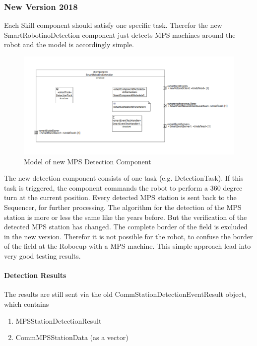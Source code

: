 \subsubsection{ New Version 2018}

Each Skill component should satisfy one specific task. Therefor the new SmartRobotinoDetection component just detects MPS machines around the robot and the model is accordingly simple.

\begin{figure}[h]
\centering
\includegraphics[scale=0.4]{pic/detectionComponent.png}
\caption{Model of new MPS Detection Component}
\label{fig:dockingNew_overview}
\end{figure}

The new detection component consists of one task (e.g. DetectionTask). If this task is triggered, the component commands the robot to perform a 360 degree turn at the current position. Every detected MPS station is sent back to the Sequencer, for further processing. 
The algorithm for the detection of the MPS station is more or less the same like the years before. But the verification of the detected MPS station has changed. The complete border of the field is excluded in the new version. Therefor it is not possible for the robot, to confuse the border of the field at the Robocup with a MPS machine. This simple approach lead into very good testing results. 

\paragraph{Detection Results}
The results are still sent via the old CommStationDetectionEventResult object, which contains 

\begin{enumerate}
\item MPSStationDetectionResult
\item CommMPSStationData (as a vector)
\end{enumerate}

